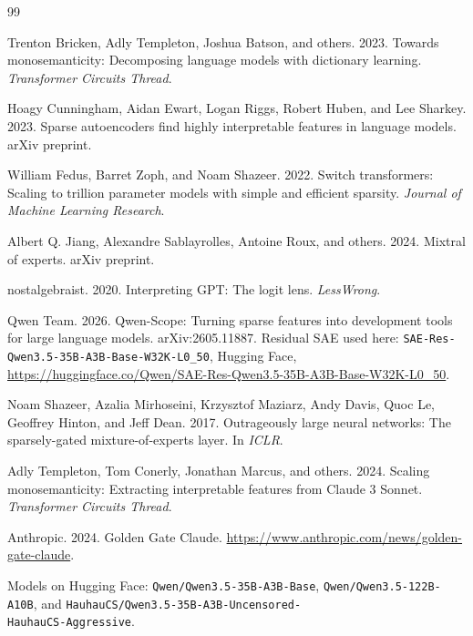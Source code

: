 \documentclass[10pt,a4paper,twocolumn]{article}
\begin{document}
\begin{thebibliography}{99}

Trenton Bricken, Adly Templeton, Joshua Batson, and others. 2023. Towards
monosemanticity: Decomposing language models with dictionary learning.
\emph{Transformer Circuits Thread}.

Hoagy Cunningham, Aidan Ewart, Logan Riggs, Robert Huben, and Lee Sharkey. 2023.
Sparse autoencoders find highly interpretable features in language models.
arXiv preprint.

William Fedus, Barret Zoph, and Noam Shazeer. 2022. Switch transformers: Scaling
to trillion parameter models with simple and efficient sparsity. \emph{Journal of
Machine Learning Research}.

Albert Q. Jiang, Alexandre Sablayrolles, Antoine Roux, and others. 2024. Mixtral
of experts. arXiv preprint.

nostalgebraist. 2020. Interpreting GPT: The logit lens. \emph{LessWrong}.

Qwen Team. 2026. Qwen-Scope: Turning sparse features into development tools for
large language models. arXiv:2605.11887. Residual SAE used here:
\texttt{SAE-Res-Qwen3.5-35B-A3B-Base-W32K-L0\_50}, Hugging Face,
\url{https://huggingface.co/Qwen/SAE-Res-Qwen3.5-35B-A3B-Base-W32K-L0_50}.

Noam Shazeer, Azalia Mirhoseini, Krzysztof Maziarz, Andy Davis, Quoc Le, Geoffrey
Hinton, and Jeff Dean. 2017. Outrageously large neural networks: The
sparsely-gated mixture-of-experts layer. In \emph{ICLR}.

Adly Templeton, Tom Conerly, Jonathan Marcus, and others. 2024. Scaling
monosemanticity: Extracting interpretable features from Claude 3 Sonnet.
\emph{Transformer Circuits Thread}.

Anthropic. 2024. Golden Gate Claude.
\url{https://www.anthropic.com/news/golden-gate-claude}.

Models on Hugging Face: \texttt{Qwen/Qwen3.5-35B-A3B-Base},
\texttt{Qwen/Qwen3.5-122B-A10B}, and
\texttt{HauhauCS/Qwen3.5-35B-A3B-Uncensored-}\\
\texttt{HauhauCS-Aggressive}.

\end{thebibliography}
\end{document}
